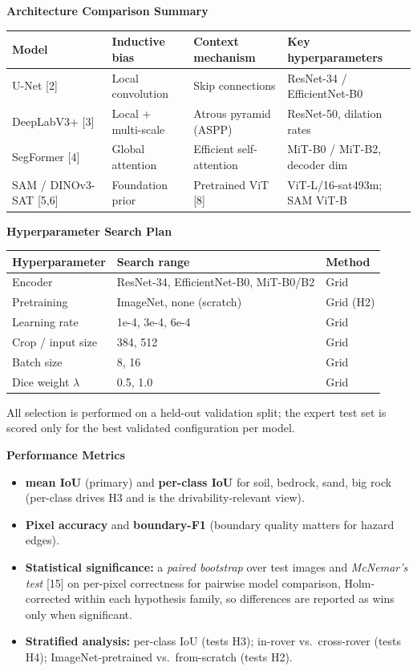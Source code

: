 \documentclass[11pt]{article}
\newcommand{\hdr}[1]{\medskip\noindent\textbf{#1}\par\nopagebreak}
\begin{document}
\hdr{Architecture Comparison Summary}
\begin{center}
\begin{tabular}{@{}llll@{}}
\toprule
Model & Inductive bias & Context mechanism & Key hyperparameters \\
\midrule
U-Net [2] & Local convolution & Skip connections & ResNet-34 / EfficientNet-B0 \\
DeepLabV3+ [3] & Local + multi-scale & Atrous pyramid (ASPP) & ResNet-50, dilation rates \\
SegFormer [4] & Global attention & Efficient self-attention & MiT-B0 / MiT-B2, decoder dim \\
SAM / DINOv3-SAT [5,6] & Foundation prior & Pretrained ViT [8] & ViT-L/16-sat493m; SAM ViT-B \\
\bottomrule
\end{tabular}
\end{center}

\hdr{Hyperparameter Search Plan}
\begin{center}
\begin{tabular}{@{}lll@{}}
\toprule
Hyperparameter & Search range & Method \\
\midrule
Encoder & ResNet-34, EfficientNet-B0, MiT-B0/B2 & Grid \\
Pretraining & ImageNet, none (scratch) & Grid (H2) \\
Learning rate & 1e-4, 3e-4, 6e-4 & Grid \\
Crop / input size & 384, 512 & Grid \\
Batch size & 8, 16 & Grid \\
Dice weight $\lambda$ & 0.5, 1.0 & Grid \\
\bottomrule
\end{tabular}
\end{center}
\noindent All selection is performed on a held-out validation split; the expert test set is scored
only for the best validated configuration per model.

\hdr{Performance Metrics}
\begin{itemize}
  \item \textbf{mean IoU} (primary) and \textbf{per-class IoU} for soil, bedrock, sand, big rock
  (per-class drives H3 and is the drivability-relevant view).
  \item \textbf{Pixel accuracy} and \textbf{boundary-F1} (boundary quality matters for hazard edges).
  \item \textbf{Statistical significance:} a \emph{paired bootstrap} over test images and
  \emph{McNemar's test} [15] on per-pixel correctness for pairwise model comparison, Holm-corrected
  within each hypothesis family, so differences are reported as wins only when significant.
  \item \textbf{Stratified analysis:} per-class IoU (tests H3); in-rover vs.\ cross-rover (tests H4);
  ImageNet-pretrained vs.\ from-scratch (tests H2).
\end{itemize}
\end{document}
